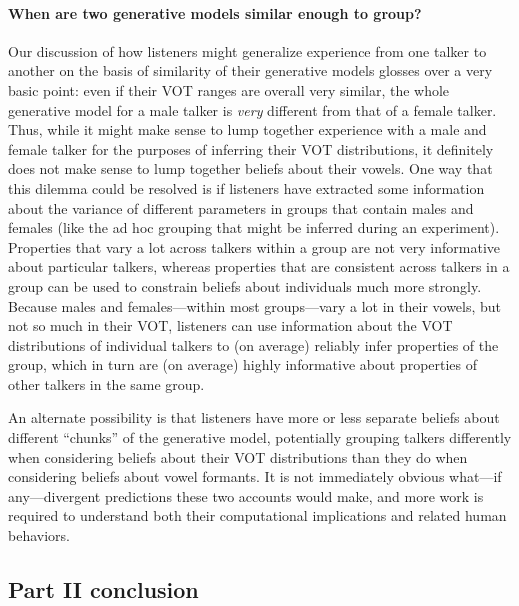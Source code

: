 \paragraph{When are two generative models similar enough to group?}
\label{sec:open-questions}

Our discussion of how listeners might generalize experience from one talker to another on the basis of similarity of their generative models glosses over a very basic point: even if their VOT ranges are overall very similar, the whole generative model for a male talker is \emph{very} different from that of a female talker.  Thus, while it might make sense to lump together experience with a male and female talker for the purposes of inferring their VOT distributions, it definitely does not make sense to lump together beliefs about their vowels.  One way that this dilemma could be resolved is if listeners have extracted some information about the variance of different parameters in groups that contain males and females (like the ad hoc grouping that might be inferred during an experiment).  Properties that vary a lot across talkers within a group are not very informative about particular talkers, whereas properties that are consistent across talkers in a group can be used to constrain beliefs about individuals much more strongly.  Because males and females---within most groups---vary a lot in their vowels, but not so much in their VOT, listeners can use information about the VOT distributions of individual talkers to (on average) reliably infer properties of the group, which in turn are (on average) highly informative about properties of other talkers in the same group.

An alternate possibility is that listeners have more or less separate beliefs about different ``chunks'' of the generative model, potentially grouping talkers differently when considering beliefs about their VOT distributions than they do when considering beliefs about vowel formants.  It is not immediately obvious what---if any---divergent predictions these two accounts would make, and more work is required to understand both their computational implications and related human behaviors.

\label{r1-cluster-questions-end}

\subsection{Part II conclusion}
\label{sec:part-ii-conclusion}

